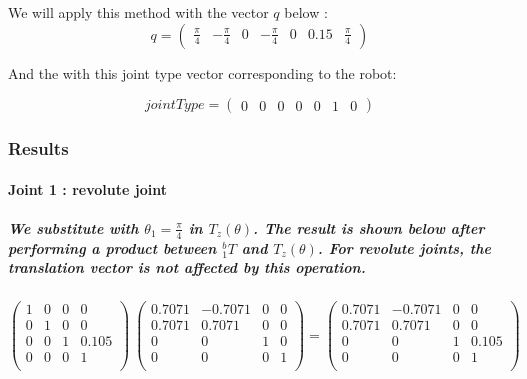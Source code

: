 We will apply this method with the vector $q$ below : 
\[
q = \begin{pmatrix}
    \frac{\pi}{4} & -\frac{\pi}{4} & 0 & -\frac{\pi}{4} & 0 & 0.15 & \frac{\pi}{4}
\end{pmatrix}
\]

And the with this joint type vector corresponding to the robot:

\[
jointType = \begin{pmatrix}
    0 & 0& 0&0 &0&1 &0
\end{pmatrix}
\]

\subsubsection{Results}

\paragraph{Joint 1 : revolute joint} 
\subparagraph{We substitute with $\theta_1 = \frac{\pi}{4}$ in $T_z(\theta)$. The result is shown below after performing a product between $^{b}_1T$ and $T_z(\theta)$. For revolute joints, the translation vector is not affected by this operation.}

\[
\begin{pmatrix}
1 & 0 & 0 & 0 \\
0 & 1 & 0 & 0 \\
0 & 0 & 1 & 0.105 \\
0 & 0 & 0 & 1 \\
\end{pmatrix}
\
\begin{pmatrix}
0.7071 & -0.7071 & 0 & 0 \\
0.7071 & 0.7071 & 0 & 0 \\
0 & 0 & 1 & 0 \\
0 & 0 & 0 & 1 \\
\end{pmatrix}
=
\begin{pmatrix}
0.7071 & -0.7071 & 0 & 0 \\
0.7071 & 0.7071 & 0 & 0 \\
0 & 0 & 1 & 0.105 \\
0 & 0 & 0 & 1 \\
\end{pmatrix}
\]

